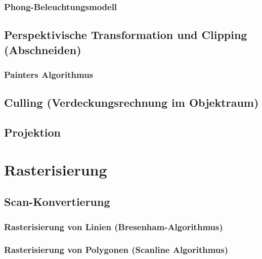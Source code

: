 \documentclass[a4paper, 11pt, accentcolor = tud3b]{tudreport}
\begin{document}
				\subsubsection{Phong-Beleuchtungsmodell} %

			\subsection{Perspektivische Transformation und Clipping (Abschneiden)} %

				\subsubsection{Painters Algorithmus} %

			\subsection{Culling (Verdeckungsrechnung im Objektraum)} %

			\subsection{Projektion} %

		\section{Rasterisierung} %

			\subsection{Scan-Konvertierung} %

				\subsubsection{Rasterisierung von Linien (Bresenham-Algorithmus)} %

				\subsubsection{Rasterisierung von Polygonen (Scanline Algorithmus)} %
\end{document}

